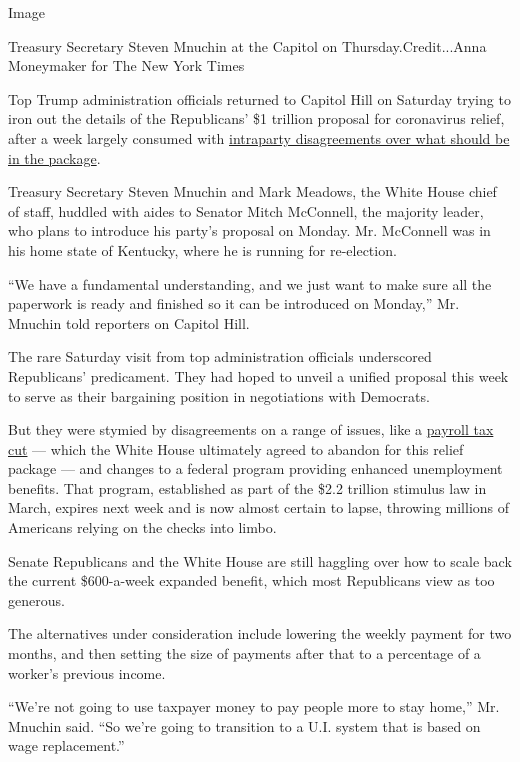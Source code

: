 Image

Treasury Secretary Steven Mnuchin at the Capitol on
Thursday.Credit...Anna Moneymaker for The New York Times

Top Trump administration officials returned to Capitol Hill on Saturday
trying to iron out the details of the Republicans' \$1 trillion proposal
for coronavirus relief, after a week largely consumed with
\href{https://www.nytimes3xbfgragh.onion/2020/07/23/us/politics/republicans-stimulus-coronavirus.html}{intraparty
disagreements over what should be in the package}.

Treasury Secretary Steven Mnuchin and Mark Meadows, the White House
chief of staff, huddled with aides to Senator Mitch McConnell, the
majority leader, who plans to introduce his party's proposal on Monday.
Mr. McConnell was in his home state of Kentucky, where he is running for
re-election.

``We have a fundamental understanding, and we just want to make sure all
the paperwork is ready and finished so it can be introduced on Monday,''
Mr. Mnuchin told reporters on Capitol Hill.

The rare Saturday visit from top administration officials underscored
Republicans' predicament. They had hoped to unveil a unified proposal
this week to serve as their bargaining position in negotiations with
Democrats.

But they were stymied by disagreements on a range of issues, like a
\href{https://www.nytimes3xbfgragh.onion/2020/07/23/business/payroll-tax-cut-trump-recession.html}{payroll
tax cut} --- which the White House ultimately agreed to abandon for this
relief package --- and changes to a federal program providing enhanced
unemployment benefits. That program, established as part of the \$2.2
trillion stimulus law in March, expires next week and is now almost
certain to lapse, throwing millions of Americans relying on the checks
into limbo.

Senate Republicans and the White House are still haggling over how to
scale back the current \$600-a-week expanded benefit, which most
Republicans view as too generous.

The alternatives under consideration include lowering the weekly payment
for two months, and then setting the size of payments after that to a
percentage of a worker's previous income.

``We're not going to use taxpayer money to pay people more to stay
home,'' Mr. Mnuchin said. ``So we're going to transition to a U.I.
system that is based on wage replacement.''

